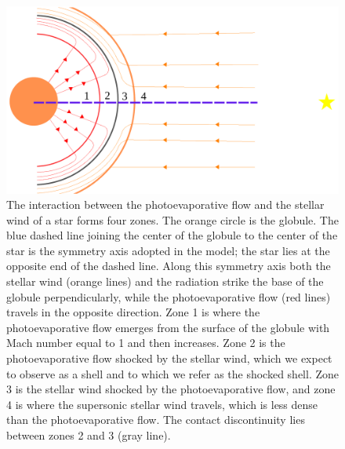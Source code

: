 \documentclass{book}
\begin{document}
\begin{figure}[htb]
    \centering    \includegraphics[width=\textwidth]{imagenes_corregidas/Arreglo 01.pdf}
    \caption{The interaction between the photoevaporative flow and the
      stellar wind of a star forms four zones. The orange circle is
      the globule. The blue dashed line joining the center of the
      globule to the center of the star is the symmetry axis adopted
      in the model; the star lies at the opposite end of the dashed
      line. Along this symmetry axis both the stellar wind (orange
      lines) and the radiation strike the base of the globule
      perpendicularly, while the photoevaporative flow (red lines)
      travels in the opposite direction. Zone 1 is where the
      photoevaporative flow emerges from the surface of the globule
      with Mach number equal to 1 and then increases. Zone 2 is the
      photoevaporative flow shocked by the stellar wind, which we
      expect to observe as a shell and to which we refer as the
      shocked shell. Zone 3 is the stellar wind shocked by the
      photoevaporative flow, and zone 4 is where the supersonic
      stellar wind travels, which is less dense than the
      photoevaporative flow. The contact discontinuity lies between
      zones 2 and 3 (gray line).}
    \label{fig:zones}
\end{figure}
\end{document}
